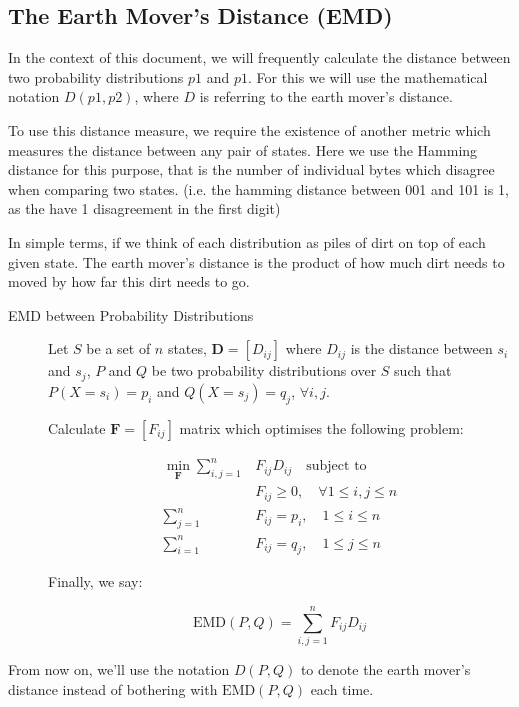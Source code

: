 \subsection{The Earth Mover's Distance (EMD)}
In the context of this document, we will frequently calculate the distance between two probability distributions $p1$ and $p1$. For this we will use the mathematical notation $D(p1,p2)$, where $D$ is referring to the earth mover's distance.

To use this distance measure, we require the existence of another metric which measures the distance between any pair of states. Here we use the Hamming distance for this purpose, that is the number of individual bytes which disagree when comparing two states. (i.e. the hamming distance between 001 and 101 is 1, as the have 1 disagreement in the first digit)

In simple terms, if we think of each distribution as piles of dirt on top of each given state. The earth mover's distance is the product of how much dirt needs to moved by how far this dirt needs to go. 

\begin{description}
	\item[EMD between Probability Distributions] Let $S$ be a set of $n$ states, $\mathbf{D} = \left[ D_{ij}\right]$ where $D_{ij}$ is the distance between $s_i$ and $s_j$, $P$ and $Q$ be two probability distributions over $S$ such that $P(X = s_i) = p_i$ and $Q(X=s_j) = q_j$, $\forall i,j$. 
	
	Calculate $\mathbf{F} = \left[F_{ij}\right]$ matrix which optimises the following problem:
	
	\begin{align}
	\label{eq:EMD1}
	\min \limits_{\mathbf{F}}\sum \limits_{i,j=1}^n &F_{ij} D_{ij}\quad \text{subject to}\\
	&F_{ij}\geq 0,\quad \forall 1 \leq i,j \leq n\\
	\sum \limits_{j=1}^n &F_{ij} = p_i,\quad 1 \leq i \leq n\\
	\sum \limits_{i=1}^n &F_{ij} = q_j,\quad 1 \leq j \leq n
	\end{align}
	
	Finally, we say: 
	
	\begin{equation}
	\label{def:EMD}
	\text{EMD}(P, Q) = \sum \limits_{i,j=1}^{n} F_{ij} D_{ij}
	\end{equation}
\end{description}

From now on, we'll use the notation $D(P,Q)$ to denote the earth mover's distance instead of bothering with $\text{EMD}(P,Q)$ each time.

